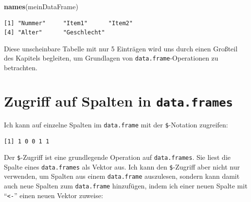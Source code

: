 \documentclass[12pt,]{tufte-book}
\newenvironment{Shaded}{\begin{snugshade}}{\end{snugshade}}
\newcommand{\KeywordTok}[1]{\textcolor[rgb]{0.13,0.29,0.53}{\textbf{#1}}}
\newcommand{\StringTok}[1]{\textcolor[rgb]{0.31,0.60,0.02}{#1}}
\newcommand{\CommentTok}[1]{\textcolor[rgb]{0.56,0.35,0.01}{\textit{#1}}}
\newcommand{\OperatorTok}[1]{\textcolor[rgb]{0.81,0.36,0.00}{\textbf{#1}}}
\newcommand{\NormalTok}[1]{#1}
\theoremstyle{definition}
\theoremstyle{definition}
\theoremstyle{definition}
\theoremstyle{remark}
\begin{document}
\begin{Shaded}
\begin{Highlighting}[]
\KeywordTok{names}\NormalTok{(meinDataFrame)}
\end{Highlighting}
\end{Shaded}

\begin{verbatim}
[1] "Nummer"     "Item1"      "Item2"     
[4] "Alter"      "Geschlecht"
\end{verbatim}

Diese unscheinbare Tabelle mit nur 5 Einträgen wird uns durch einen
Großteil des Kapitels begleiten, um Grundlagen von
\texttt{data.frame}-Operationen zu betrachten.

\section{\texorpdfstring{Zugriff auf Spalten in
\texttt{data.frames}}{Zugriff auf Spalten in data.frames}}\label{zugriff-auf-spalten-in-data.frames}

Ich kann auf einzelne Spalten im \texttt{data.frame} mit der
\texttt{\$}-Notation zugreifen:

\begin{Shaded}
\end{Shaded}

\begin{verbatim}
[1] 1 0 0 1 1
\end{verbatim}

Der \texttt{\$}-Zugriff ist eine grundlegende Operation auf
\texttt{data.frames}. Sie liest die Spalte eines \texttt{data.frames}
als Vektor aus. Ich kann den \texttt{\$}-Zugriff aber nicht nur
verwenden, um Spalten aus einem \texttt{data.frame} auszulesen, sondern
kann damit auch neue Spalten zum \texttt{data.frame} hinzufügen, indem
ich einer neuen Spalte mit ``\texttt{\textless{}-}'' einen neuen Vektor
zuweise:

\begin{Shaded}
\end{Shaded}
\end{document}
